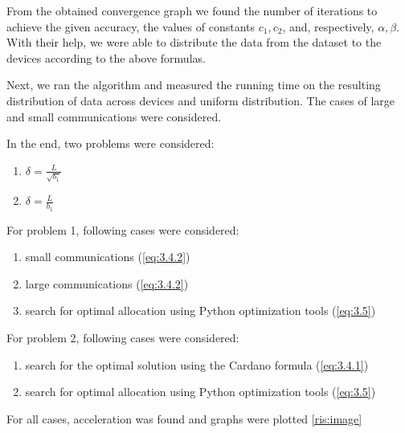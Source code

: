 \documentclass{article}
\begin{document}
From the obtained convergence graph we found the number of iterations to achieve the given accuracy, the values of constants $c_1, c_2$, and, respectively, $\alpha, \beta$. With their help, we were able to distribute the data from the dataset to the devices according to the above formulas. 

Next, we ran the algorithm and measured the running time on the resulting distribution of data across devices and uniform distribution. The cases of large and small communications were considered. 

In the end, two problems were considered: 
\begin{enumerate}
    \item $\delta = \frac{L}{\sqrt{b_1}}$ 
    \item $\delta = \frac{L}{b_1}$
\end{enumerate}

For problem 1, following cases were considered:
\begin{enumerate}
    \item small communications (\ref{eq:3.4.2})
    \item large communications (\ref{eq:3.4.2})
    \item search for optimal allocation using Python optimization tools (\ref{eq:3.5})
\end{enumerate}

For problem 2, following cases were considered:
\begin{enumerate}
    \item search for the optimal solution using the Cardano formula (\ref{eq:3.4.1})
    \item search for optimal allocation using Python optimization tools (\ref{eq:3.5})
\end{enumerate}

For all cases, acceleration was found and graphs were plotted \ref{ris:image}
\end{document}
